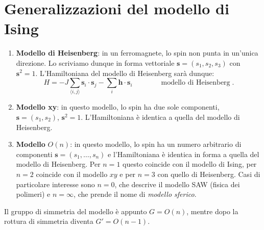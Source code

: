 \documentclass[10pt,a4paper]{report}
\theoremstyle{definition}
\numberwithin{equation}{section}
\newcommand{\bra}{\langle}
\newcommand{\ket}{\rangle}
\begin{document}
\section{Generalizzazioni del modello di Ising}
\begin{enumerate}
\item \textbf{Modello di Heisenberg}: in un ferromagnete, lo spin non punta in un'unica direzione. Lo scriviamo dunque in forma vettoriale $\mathbf{s}=(s_1,s_2,s_3)$ con $\mathbf{s}^2=1$. L'Hamiltoniana del modello di Heisenberg sarà dunque:
\begin{equation}
H=-J\sum_{\bra i,j\ket}\mathbf{s}_i\cdot\mathbf{s}_j-\sum_i\mathbf{h}\cdot\mathbf{s}_i\qquad\qquad \mbox{modello di Heisenberg}\;.
\end{equation}
\item \textbf{Modello xy}: in questo modello, lo spin ha due sole componenti, $\mathbf{s}=(s_1,s_2)$, $\mathbf{s}^2=1$. L'Hamiltoniana è identica a quella del modello di Heisenberg.
\item \textbf{Modello} $O(n)$: in questo modello, lo spin ha un numero arbitrario di componenti $\mathbf{s}=(s_1,\ldots,s_n)$ e l'Hamiltoniana è identica in forma a quella del modello di Heisenberg. Per $n=1$ questo coincide con il modello di Ising, per $n=2$ coincide con il modello $xy$ e per $n=3$ con quello di Heisenberg. Casi di particolare interesse sono $n=0$, che descrive il modello SAW (fisica dei polimeri) e $n=\infty$, che prende il nome di \emph{modello sferico}.
\end{enumerate}
Il gruppo di simmetria del modello è appunto $G=O(n)$, mentre dopo la rottura di simmetria diventa $G'=O(n-1)$.
\end{document}

